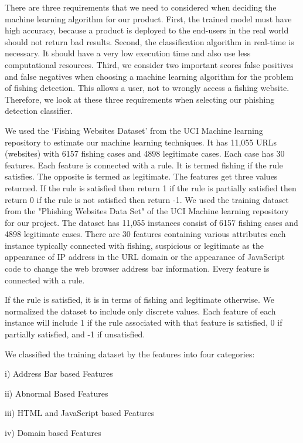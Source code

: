 \documentclass[twocolumn,10pt]{article}
\begin{document}
There are three requirements that we need to considered when deciding the machine learning algorithm for our product. First, the trained model must have high accuracy, because a product is deployed to the end-users in the real world should not return bad results. Second, the classification algorithm in real-time is necessary. It should have a very low execution time and also use less computational resources. Third, we consider two important scores false positives and false negatives when choosing a machine learning algorithm for the problem of fishing detection. This allows a user, not to wrongly access a fishing website. Therefore, we look at these three requirements when selecting our phishing detection classifier.

We used the ‘Fishing Websites Dataset’ from the UCI Machine learning repository to estimate our machine learning techniques. It has 11,055 URLs (websites) with 6157 fishing cases and 4898 legitimate cases. Each case has 30 features. Each feature is connected with a rule. It is termed fishing if the rule satisfies. The opposite is termed as legitimate. The features get three values returned. If the rule is satisfied then return 1 if the rule is partially satisfied then return 0 if the rule is not satisfied then return -1. We used the training dataset from the "Phishing Websites Data Set" of the UCI Machine learning repository for our project. The dataset has 11,055 instances consist of 6157 fishing cases and 4898 legitimate cases. There are 30 features containing various attributes each instance typically connected with fishing, suspicious or legitimate as the appearance of IP address in the URL domain or the appearance of JavaScript code to change the web browser address bar information. Every feature is connected with a rule.

If the rule is satisfied, it is in terms of fishing and legitimate otherwise. We normalized the dataset to include only discrete values. Each feature of each instance will include 1 if the rule associated with that feature is satisfied, 0 if partially satisfied, and -1 if unsatisfied.

We classified the training dataset by the features into four categories:

i) Address Bar based Features

ii) Abnormal Based Features

iii) HTML and JavaScript based Features

iv) Domain based Features
\end{document}
